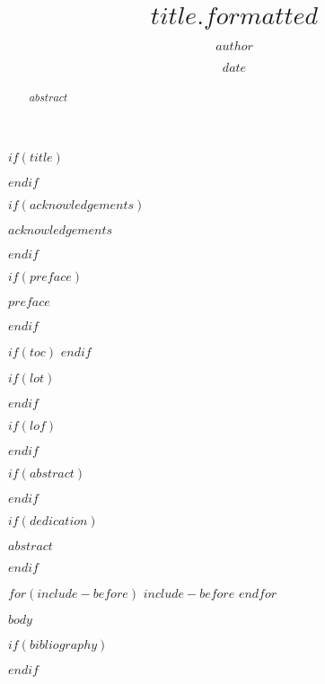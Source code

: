 \documentclass[12pt,twoside]{reedthesis}
\title{$title.formatted$}
\author{$author$}
\date{$date$}
\begin{document}
  $if(title)$
    \maketitle
  $endif$

  \frontmatter %
  \pagestyle{empty} %

  $if(acknowledgements)$
    \begin{acknowledgements}
      $acknowledgements$
    \end{acknowledgements}
  $endif$

  $if(preface)$
    \begin{preface}
      $preface$
    \end{preface}
  $endif$


  $if(toc)$
  {
    \hypersetup{linkcolor=$if(toccolor)$$toccolor$$else$black$endif$}
    \setcounter{tocdepth}{$toc-depth$}
    \tableofcontents
  }
  $endif$

  $if(lot)$
    \listoftables
  $endif$

  $if(lof)$
    \listoffigures
  $endif$

  $if(abstract)$
    \begin{abstract}
      $abstract$
    \end{abstract}
  $endif$

  $if(dedication)$
    \begin{dedication}
      $abstract$
    \end{dedication}
  $endif$

  $for(include-before)$
    $include-before$
  $endfor$

  \mainmatter %
  \pagestyle{fancyplain} %

  $body$

  \backmatter
  \clearpage

  $if(bibliography)$
    
    
  $endif$
\end{document}
